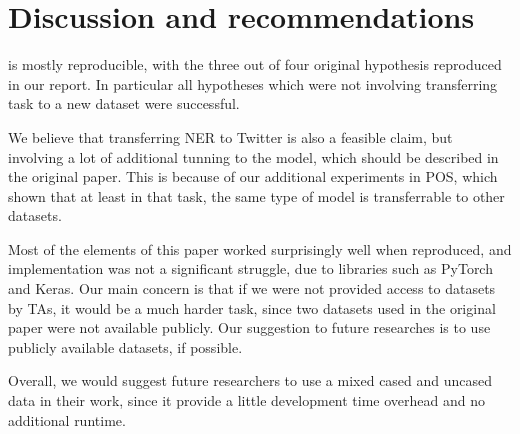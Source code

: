\documentclass[11pt,a4paper]{article}
\begin{document}
\section{Discussion and recommendations}
\cite{ner-and-pos-original} is mostly reproducible, with the three out of four original hypothesis reproduced in our report. In particular all hypotheses which were not involving transferring task to a new dataset were successful.

We believe that transferring NER to Twitter is also a feasible claim, but involving a lot of additional tunning to the model, which should be described in the original paper. This is because of our additional experiments in POS, which shown that at least in that task, the same type of model is transferrable to other datasets.

Most of the elements of this paper worked surprisingly well when reproduced, and implementation was not a significant struggle, due to libraries such as PyTorch and Keras. Our main concern is that if we were not provided access to datasets by TAs, it would be a much harder task, since two datasets used in the original paper were not available publicly. Our suggestion to future researches is to use publicly available datasets, if possible.

Overall, we would suggest future researchers to use a mixed cased and uncased data in their work, since it provide a little development time overhead and no additional runtime.



\end{document}
